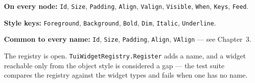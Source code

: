 \documentclass[11pt,a4paper,twoside,openany]{book}
\newcommand{\code}[1]{\texttt{\small #1}}
\begin{document}
\vspace{0.5em}
\noindent\textbf{\sffamily On every node:} \code{Id}, \code{Size}, \code{Padding},
\code{Align}, \code{Valign}, \code{Visible}, \code{When}, \code{Keys}, \code{Feed}.

\vspace{1em}
\noindent\textbf{\sffamily Style keys:} \code{Foreground}, \code{Background},
\code{Bold}, \code{Dim}, \code{Italic}, \code{Underline}.

\vspace{0.5em}
\noindent\textbf{\sffamily Common to every name:} \code{Id}, \code{Size},
\code{Padding}, \code{Align}, \code{VAlign} --- see Chapter~3.

\begin{notebox}
The registry is open. \code{TuiWidgetRegistry.Register} adds a name, and a widget
reachable only from the object style is considered a gap --- the test suite
compares the registry against the widget types and fails when one has no name.
\end{notebox}
\end{document}
